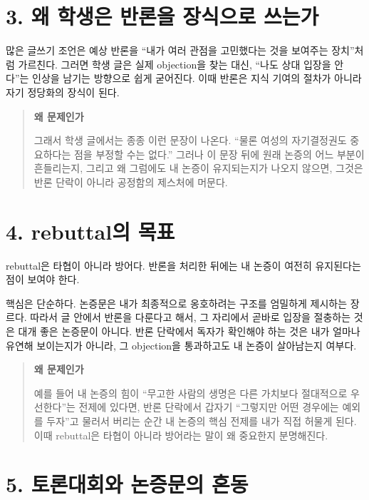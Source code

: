 \section{3. 왜 학생은 반론을 장식으로 쓰는가}\label{3-uxc65c-uxd559uxc0dduxc740-uxbc18uxb860uxc744-uxc7a5uxc2dduxc73cuxb85c-uxc4f0uxb294uxac00}

많은 글쓰기 조언은 예상 반론을 ``내가 여러 관점을 고민했다는 것을 보여주는 장치''처럼 가르친다. 그러면 학생 글은 실제 objection을 찾는 대신, ``나도 상대 입장을 안다''는 인상을 남기는 방향으로 쉽게 굳어진다. 이때 반론은 지식 기여의 절차가 아니라 자기 정당화의 장식이 된다.

\begin{quote}
\textbf{왜 문제인가}

그래서 학생 글에서는 종종 이런 문장이 나온다. ``물론 여성의 자기결정권도 중요하다는 점을 부정할 수는 없다.'' 그러나 이 문장 뒤에 원래 논증의 어느 부분이 흔들리는지, 그리고 왜 그럼에도 내 논증이 유지되는지가 나오지 않으면, 그것은 반론 단락이 아니라 공정함의 제스처에 머문다.
\end{quote}

\section{4. rebuttal의 목표}\label{4-rebuttaluxc758-uxbaa9uxd45c}

rebuttal은 타협이 아니라 방어다. 반론을 처리한 뒤에는 내 논증이 여전히 유지된다는 점이 보여야 한다.

핵심은 단순하다. 논증문은 내가 최종적으로 옹호하려는 구조를 엄밀하게 제시하는 장르다. 따라서 글 안에서 반론을 다룬다고 해서, 그 자리에서 곧바로 입장을 절충하는 것은 대개 좋은 논증문이 아니다. 반론 단락에서 독자가 확인해야 하는 것은 내가 얼마나 유연해 보이는지가 아니라, 그 objection을 통과하고도 내 논증이 살아남는지 여부다.

\begin{quote}
\textbf{왜 문제인가}

예를 들어 내 논증의 힘이 ``무고한 사람의 생명은 다른 가치보다 절대적으로 우선한다''는 전제에 있다면, 반론 단락에서 갑자기 ``그렇지만 어떤 경우에는 예외를 두자''고 물러서 버리는 순간 내 논증의 핵심 전제를 내가 직접 허물게 된다. 이때 rebuttal은 타협이 아니라 방어라는 말이 왜 중요한지 분명해진다.
\end{quote}

\section{5. 토론대회와 논증문의 혼동}\label{5-uxd1a0uxb860uxb300uxd68cuxc640-uxb17cuxc99duxbb38uxc758-uxd63cuxb3d9}

